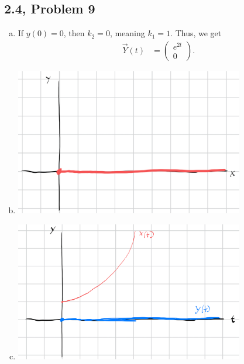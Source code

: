 \documentclass[10pt]{mypackage}
\begin{document}
\subsection{2.4, Problem 9}%
\begin{enumerate}[(a)]
  \item If $y(0) = 0$, then $k_2 = 0$, meaning $k_1 = 1$. Thus, we get
    \begin{align*}
      \vec{Y}(t) &= \begin{pmatrix}e^{2t}\\0\end{pmatrix}.
    \end{align*}
  \item \hfill
    \begin{center}
      \includegraphics[width=10cm]{images/2_4_9b.png}
    \end{center}
  \item \hfill
    \begin{center}
      \includegraphics[width=10cm]{images/2_4_9c.png}
    \end{center}
\end{enumerate}
\end{document}
